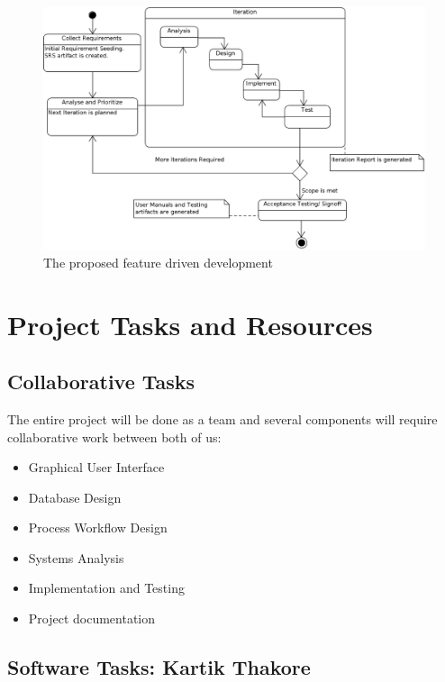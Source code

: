 \documentclass{journal}
\begin{document}
\begin{figure}[!h]
\begin{center}
\includegraphics[width=18cm]{images/Methodology} \caption{ The proposed feature driven development } \label{fig:methods}

\end{center}
\end{figure}

\newpage

\section{Project Tasks and Resources}

\subsection{ Collaborative Tasks }

The entire project will be done as a team and several components will require collaborative work between both of us:

\begin{itemize}
\item Graphical User Interface
\item Database  Design
\item Process Workflow Design
\item Systems Analysis
\item Implementation and Testing
\item Project documentation
\end{itemize}

\subsection{ Software Tasks: Kartik Thakore }
\end{document}
